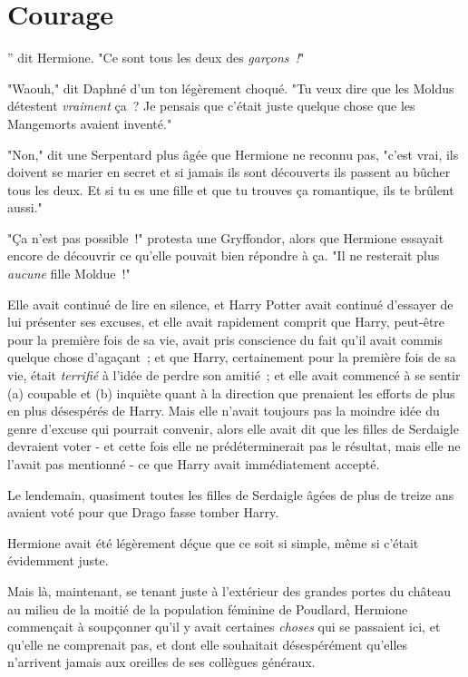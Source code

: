 \chapter{Courage}

” dit Hermione. "Ce sont tous les deux des \emph{garçons~!}"

\hplettrineextrapara
"Waouh," dit Daphné d'un ton légèrement choqué. "Tu veux dire que les Moldus détestent \emph{vraiment} ça~? Je pensais que c'était juste quelque chose que les Mangemorts avaient inventé."

"Non," dit une Serpentard plus âgée que Hermione ne reconnu pas, "c'est vrai, ils doivent se marier en secret et si jamais ils sont découverts ils passent au bûcher tous les deux. Et si tu es une fille et que tu trouves ça romantique, ils te brûlent aussi."

"Ça n'est pas possible~!" protesta une Gryffondor, alors que Hermione essayait encore de découvrir ce qu'elle pouvait bien répondre à ça. "Il ne resterait plus \emph{aucune} fille Moldue~!"

Elle avait continué de lire en silence, et Harry Potter avait continué d'essayer de lui présenter ses excuses, et elle avait rapidement comprit que Harry, peut-être pour la première fois de sa vie, avait pris conscience du fait qu'il avait commis quelque chose d'agaçant~; et que Harry, certainement pour la première fois de sa vie, était \emph{terrifié} à l'idée de perdre son amitié~; et elle avait commencé à se sentir (a) coupable et (b) inquiète quant à la direction que prenaient les efforts de plus en plus désespérés de Harry. Mais elle n'avait toujours pas la moindre idée du genre d'excuse qui pourrait convenir, alors elle avait dit que les filles de Serdaigle devraient voter - et cette fois elle ne prédéterminerait pas le résultat, mais elle ne l'avait pas mentionné - ce que Harry avait immédiatement accepté.

Le lendemain, quasiment toutes les filles de Serdaigle âgées de plus de treize ans avaient voté pour que Drago fasse tomber Harry.

Hermione avait été légèrement déçue que ce soit si simple, même si c'était évidemment juste.

Mais là, maintenant, se tenant juste à l'extérieur des grandes portes du château au milieu de la moitié de la population féminine de Poudlard, Hermione commençait à soupçonner qu'il y avait certaines \emph{choses} qui se passaient ici, et qu'elle ne comprenait pas, et dont elle souhaitait désespérément qu'elles n'arrivent jamais aux oreilles de ses collègues généraux.

